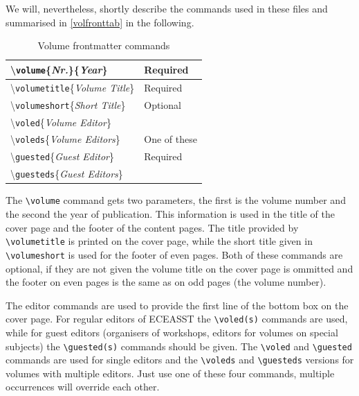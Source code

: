 \documentclass{eceasst}
\begin{document}
We will, nevertheless, shortly describe the commands used in these files and
summarised in \autoref{volfronttab} in the following.
\begin{table}
\centering
\caption{Volume frontmatter commands}\label{volfronttab}
\begin{tabular}{|l|l|}
\hline
\textbackslash\texttt{volume}\{\textit{Nr.}\}\{\textit{Year}\} &
Required \\\hline
\textbackslash\texttt{volumetitle}\{\textit{Volume Title}\} &
Required \\\hline
\textbackslash\texttt{volumeshort}\{\textit{Short Title}\} &
Optional \\\hline
\textbackslash\texttt{voled}\{\textit{Volume Editor}\} &
\\\cline{1-1}
\textbackslash\texttt{voleds}\{\textit{Volume Editors}\} &
One of these \\\cline{1-1}
\textbackslash\texttt{guested}\{\textit{Guest Editor}\} &
Required \\\cline{1-1}
\textbackslash\texttt{guesteds}\{\textit{Guest Editors}\} &
\\\hline
\end{tabular}
\end{table}

The \verb|\volume| command gets two parameters, the first is the volume number
and the second the year of publication.
This information is used in the title of the cover page and the footer of the
content pages.
The title provided by \verb|\volumetitle| is printed on the cover page, while
the short title given in \verb|\volumeshort| is used for the footer of even
pages.
Both of these commands are optional, if they are not given the volume title on
the cover page is ommitted and the footer on even pages is the same as on odd
pages (the volume number).

The editor commands are used to provide the first line of the bottom box on
the cover page.
For regular editors of ECEASST the \verb|\voled(s)| commands are used, while
for guest editors (organisers of workshops, editors for volumes on special
subjects) the \verb|\guested(s)| commands should be given.
The \verb|\voled| and \verb|\guested| commands are used for single editors and
the \verb|\voleds| and \verb|\guesteds| versions for volumes with multiple
editors.
Just use one of these four commands, multiple occurrences will override each
other.
\end{document}
